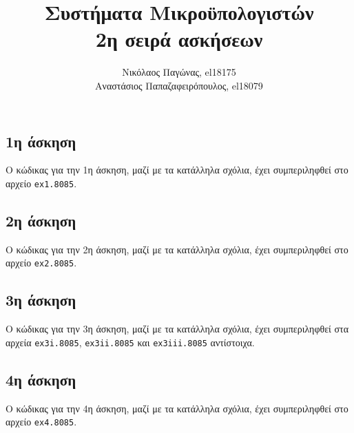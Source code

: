 \documentclass[a4paper]{article}
\title{Συστήματα Μικροϋπολογιστών \\ 2η σειρά ασκήσεων}
\author{Νικόλαος Παγώνας, el18175 \\ Αναστάσιος Παπαζαφειρόπουλος, el18079}
\date{}
\begin{document}
\maketitle

\subsection*{1η άσκηση}
Ο κώδικας για την 1η άσκηση, μαζί με τα κατάλληλα σχόλια, έχει συμπεριληφθεί στο αρχείο \texttt{ex1.8085}.

\subsection*{2η άσκηση}
Ο κώδικας για την 2η άσκηση, μαζί με τα κατάλληλα σχόλια, έχει συμπεριληφθεί στο αρχείο \texttt{ex2.8085}.

\subsection*{3η άσκηση}
Ο κώδικας για την 3η άσκηση, μαζί με τα κατάλληλα σχόλια, έχει συμπεριληφθεί στα αρχεία \texttt{ex3i.8085}, \texttt{ex3ii.8085} και \texttt{ex3iii.8085} αντίστοιχα.

\subsection*{4η άσκηση}
Ο κώδικας για την 4η άσκηση, μαζί με τα κατάλληλα σχόλια, έχει συμπεριληφθεί στο αρχείο \texttt{ex4.8085}.
\end{document}
